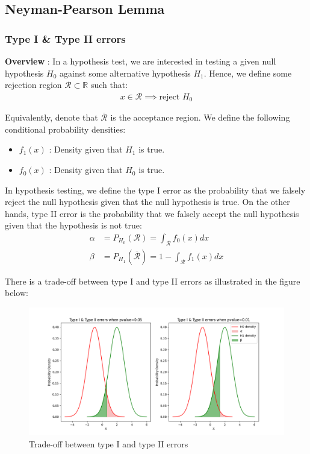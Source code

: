 \subsection{Neyman-Pearson Lemma}

\subsubsection{Type I \& Type II errors}
\textbf{Overview} : In a hypothesis test, we are interested in testing a given null hypothesis $H_0$ against some alternative hypothesis $H_1$. Hence, we define some rejection region $\mathcal{R}\subset\mathbb{R}$ such that:
\begin{align*}
    x \in \mathcal{R} \implies \text{reject } H_0 
\end{align*}

\noindent Equivalently, denote that $\overline{\mathcal{R}}$ is the acceptance region. We define the following conditional probability densities:
\begin{itemize}
    \item $f_1(x)$ : Density given that $H_1$ is true.
    \item $f_0(x)$ : Density given that $H_0$ is true.
\end{itemize}

\begin{definition}
    In hypothesis testing, we define the type I error as the probability that we falsely reject the null hypothesis given that the null hypothesis is true. On the other hands, type II error is the probability that we falsely accept the null hypothesis given that the hypothesis is not true:
    \begin{align*}
        \alpha &= P_{H_0}(\mathcal{R}) = \int_\mathcal{R} f_0(x)dx 
        \\ 
        \beta &= P_{H_1}(\overline{\mathcal{R}}) = 1 - \int_\mathcal{R} f_1(x)dx
    \end{align*}
\end{definition}

\noindent There is a trade-off between type I and type II errors as illustrated in the figure below:
\begin{figure}[ht]
    \centering
    \includegraphics[width=\textwidth]{figures/typeI_typeII_errors_tradeoff.png}
    \caption{Trade-off between type I and type II errors}
    \label{fig:type_I_type_II_errors_tradeoff}
\end{figure}


